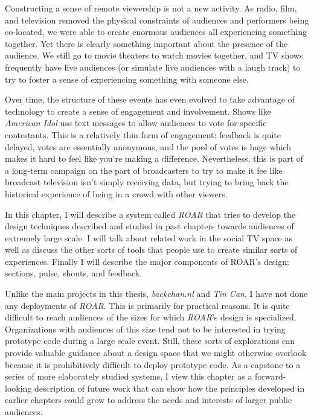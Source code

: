 Constructing a sense of remote viewership is not a new activity. As radio, film, and television removed the physical constraints of audiences and performers being co-located, we were able to create enormous audiences all experiencing something together. Yet there is clearly something important about the presence of the audience. We still go to movie theaters to watch movies together, and TV shows frequently have live audiences (or simulate live audiences with a laugh track) to try to foster a sense of experiencing something with someone else.

Over time, the structure of these events has even evolved to take advantage of technology to create a sense of engagement and involvement. Shows like \emph{American Idol} use text messages to allow audiences to vote for specific contestants. This is a relatively thin form of engagement: feedback is quite delayed, votes are essentially anonymous, and the pool of votes is huge which makes it hard to feel like you're making a difference. Nevertheless, this is part of a long-term campaign on the part of broadcasters to try to make it fee like broadcast television isn't simply receiving data, but trying to bring back the historical experience of being in a crowd with other viewers.

In this chapter, I will describe a system called \emph{ROAR} that tries to develop the design techniques described and studied in past chapters towards audiences of extremely large scale. I will talk about related work in the social TV space as well as discuss the other sorts of tools that people use to create similar sorts of experiences. Finally I will describe the major components of ROAR's design: sections, pulse, shouts, and feedback. 

Unlike the main projects in this thesis, \emph{backchan.nl} and \emph{Tin Can}, I have not done any deployments of \emph{ROAR}. This is primarily for practical reasons. It is quite difficult to reach audiences of the sizes for which \emph{ROAR}'s design is specialized. Organizations with audiences of this size tend not to be interested in trying prototype code during a large scale event. Still, these sorts of explorations can provide valuable guidance about a design space that we might otherwise overlook because it is prohibitively difficult to deploy prototype code. As a capstone to a series of more elaborately studied systems, I view this chapter as a forward-looking description of future work that can show how the principles developed in earlier chapters could grow to address the needs and interests of larger public audiences.

